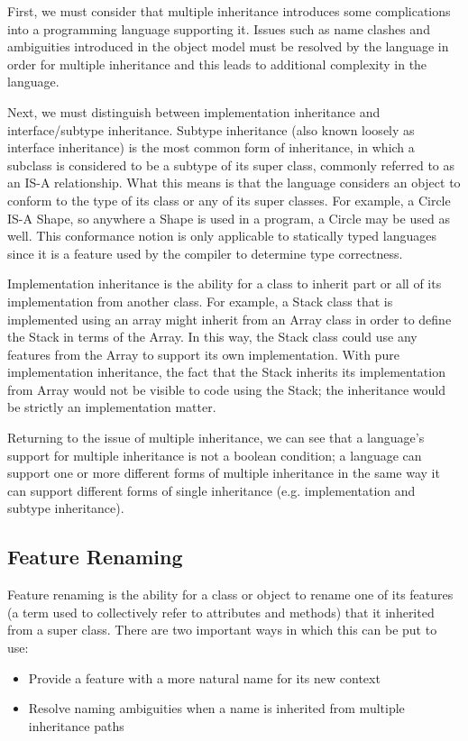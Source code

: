 \documentclass[12pt,a4paper,final,twoside,titlepage]{book}
\begin{document}
First, we must consider that multiple inheritance introduces some complications into a programming language supporting it. Issues such as name clashes and ambiguities introduced in the object model must be resolved by the language in order for multiple inheritance and this leads to additional complexity in the language. 

Next, we must distinguish between implementation inheritance and interface/subtype inheritance. Subtype inheritance (also known loosely as interface inheritance) is the most common form of inheritance, in which a subclass is considered to be a subtype of its super class, commonly referred to as an IS-A relationship. What this means is that the language considers an object to conform to the type of its class or any of its super classes. For example, a Circle IS-A Shape, so anywhere a Shape is used in a program, a Circle may be used as well. This conformance notion is only applicable to statically typed languages since it is a feature used by the compiler to determine type correctness.

Implementation inheritance is the ability for a class to inherit part or all of its implementation from another class. For example, a Stack class that is implemented using an array might inherit from an Array class in order to define the Stack in terms of the Array. In this way, the Stack class could use any features from the Array to support its own implementation. With pure implementation inheritance, the fact that the Stack inherits its implementation from Array would not be visible to code using the Stack; the inheritance would be strictly an implementation matter. 

Returning to the issue of multiple inheritance, we can see that a language's support for multiple inheritance is not a boolean condition; a language can support one or more different forms of multiple inheritance in the same way it can support different forms of single inheritance (e.g. implementation and subtype inheritance). 

\subsection{Feature Renaming}
Feature renaming is the ability for a class or object to rename one of its features (a term used to collectively refer to attributes and methods) that it inherited from a super class. There are two important ways in which this can be put to use:
\begin{itemize}
\item Provide a feature with a more natural name for its new context
\item Resolve naming ambiguities when a name is inherited from multiple inheritance paths
\end{itemize}
\end{document}
